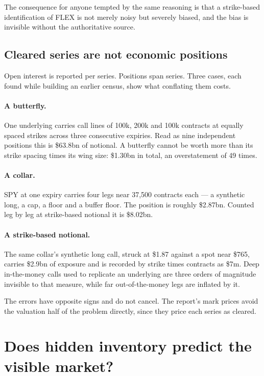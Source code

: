\documentclass[11pt]{article}
\begin{document}
The consequence for anyone tempted by the same reasoning is that a strike-based
identification of FLEX is not merely noisy but severely biased, and the bias is
invisible without the authoritative source.

\subsection{Cleared series are not economic positions}

Open interest is reported per series. Positions span series. Three cases, each found
while building an earlier census, show what conflating them costs.

\paragraph{A butterfly.} One underlying carries call lines of 100k, 200k and 100k
contracts at equally spaced strikes across three consecutive expiries. Read as nine
independent positions this is \$63.8bn of notional. A butterfly cannot be worth more
than its strike spacing times its wing size: \$1.30bn in total, an overstatement of 49
times.

\paragraph{A collar.} SPY at one expiry carries four legs near 37,500 contracts each ---
a synthetic long, a cap, a floor and a buffer floor. The position is roughly \$2.87bn.
Counted leg by leg at strike-based notional it is \$8.02bn.

\paragraph{A strike-based notional.} The same collar's synthetic long call, struck at
\$1.87 against a spot near \$765, carries \$2.9bn of exposure and is recorded by strike
times contracts as \$7m. Deep in-the-money calls used to replicate an underlying are
three orders of magnitude invisible to that measure, while far out-of-the-money legs
are inflated by it.

The errors have opposite signs and do not cancel. The report's mark prices avoid the
valuation half of the problem directly, since they price each series as cleared.

\section{Does hidden inventory predict the visible market?}
\end{document}
